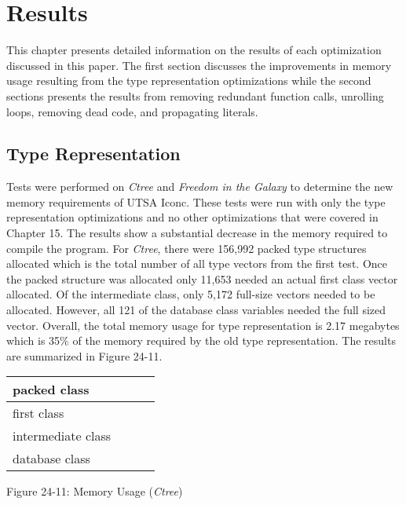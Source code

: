\section{Results}

This chapter presents detailed information on the results of each
optimization discussed in this paper. The first section discusses the
improvements in memory usage resulting from the type representation
optimizations while the second sections presents the results from
removing redundant function calls, unrolling loops, removing dead
code, and propagating literals.

\subsection{Type Representation}

Tests were performed on \textit{Ctree} and \textit{Freedom in the
Galaxy} to determine the new memory requirements of UTSA Iconc. These
tests were run with only the type representation optimizations and no
other optimizations that were covered in Chapter 15. The results show a
substantial decrease in the memory required to compile the
program. For \textit{Ctree}, there were 156,992 packed type structures
allocated which is the total number of all type vectors from the first
test. Once the packed structure was allocated only 11,653 needed an
actual first class vector allocated.  Of the intermediate class, only
5,172 full-size vectors needed to be allocated. However, all 121 of
the database class variables needed the full sized vector. Overall,
the total memory usage for type representation is 2.17 megabytes which
is 35\% of the memory required by the old type representation. The
results are summarized in Figure 24-11.

\begin{center}
\tabletail{}
\tablelasttail{}
\begin{xtabular}{|m{1.2163599in}|m{1.1969599in}|m{1.2538599in}|m{1.6636599in}|}
\hline
 packed class &
 &
 &
\raggedleft{}\\\hline
 first class &
 &
 &
\raggedleft{}\\\hline
 intermediate class &
 &
 &
\raggedleft{}\\\hline
 database class &
 &
 &
\raggedleft{}\\\hline
\end{xtabular}
\end{center}
{\centering{}
Figure 24-11: Memory Usage (\textit{Ctree})
\par}


